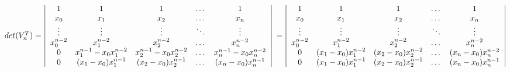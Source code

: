 \documentclass[12pt]{article}
\newenvironment{problems}{\begin{list}{}{\setlength{\labelwidth}{.7in}}}{\end{list}}
\begin{document}
\begin{problems}
 $det(V_n^T) = \left|  \begin{array}{ccccc}
   1           &  1           & 1          & \dots      & 1         \\
   x_0         &  x_1         & x_2      & \dots      & x_n     \\
   \vdots      &  \vdots      & \vdots     & \ddots     & \vdots    \\
   x_0^{n-2}   &  x_1^{n-2}   & x_2^{n-2}  & \dots      & x_n^{n-2} \\
   0         &  x_1^{n-1} - x_0x_1^{n-2}   & x_2^{n-1} - x_0x_2^{n-2}  & \dots & x_n^{n-1} -  x_0x_n^{n-2} \\
   0           &  (x_1 - x_0)x_1^{n-1}       & (x_2 - x_0)x_2^{n-1}     & \dots &(x_n - x_0)x_n^{n-1}      \\
  \end{array}           \right|\\  
  = \left|  \begin{array}{ccccc}
   1           &  1                     & 1                        & \dots      & 1         \\
   x_0         &  x_1                   & x_2                      & \dots      & x_n     \\
   \vdots      &  \vdots                & \vdots                   & \ddots     & \vdots    \\
   x_0^{n-2}   &  x_1^{n-2}             & x_2^{n-2}                & \dots      & x_n^{n-2} \\
   0           &  (x_1 - x_0)x_1^{n-2}  & (x_2 - x_0)x_2^{n-2}     & \dots      & (x_n -  x_0)x_n^{n-2} \\
   0           &  (x_1 - x_0)x_1^{n-1}  & (x_2 - x_0)x_2^{n-1}     & \dots      &(x_n - x_0)x_n^{n-1}      \\
  \end{array} \right| $
  \\  


\end{problems}
\end{document}
